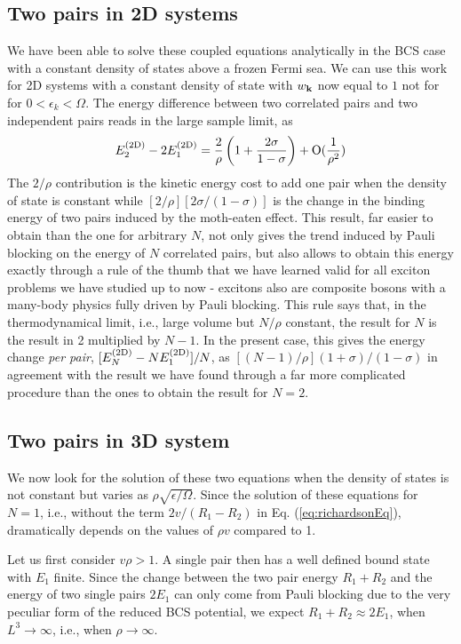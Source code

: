 \documentclass[3p,twocolumn]{elsarticle}
\begin{document}
\subsection{Two pairs in 2D systems}
We have been able to solve these coupled equations analytically in the BCS case with a constant density of states above a frozen Fermi sea\cite{combescotBCS}.  We can use  this work  for 2D systems with a constant density of state with $w_{\mathbf{k}}$ now equal to $1$ not for  for $0<\epsilon_k<\Omega$. The energy difference between two correlated pairs and two independent pairs reads in the large sample limit, as 
\begin{equation}
E^{{{\text{(2D)}}}}_2-2E_1^{{{\text{(2D)}}}}=\frac{2}{\rho}\left(1+\frac{2\sigma}{1-\sigma}\right)+\text{O}(\frac{1}{\rho^2})
\label{eq:}
\end{equation}
The $2/\rho$ contribution is the kinetic energy cost to add one pair when the density of state is constant while $[2/\rho][2\sigma/(1-\sigma)]$ is the change in the binding energy of two pairs induced by the moth-eaten effect. This result, far easier to obtain than the one for arbitrary $N$, not only gives the trend induced by Pauli blocking on the energy of $N$ correlated pairs, but also allows to obtain this energy exactly through a rule of the thumb that we have learned valid for all exciton problems we have studied up to now - excitons also are composite bosons with a many-body physics fully driven by Pauli blocking.  This rule says that, in the thermodynamical limit, i.e., large volume but $N/\rho$ constant, the result for $N$ is the result in 2 multiplied by $N-1$.  In the present case, this gives the energy change \emph{per pair}, $[E^{{{\text{(2D)}}}}_N-NE^{{{\text{(2D)}}}}_1]/N$, as $[(N-1)/\rho](1+\sigma)/(1-\sigma)$ in agreement with the result we have found through a far more complicated procedure than the ones to obtain the result for $N=2$.

\subsection{Two pairs in 3D system}
We now look for the solution of these two equations when the density of states is not constant but varies as $\rho\sqrt{\epsilon/\Omega}$.  Since the solution of these equations for $N=1$, i.e., without the term $2v/(R_1-R_2)$  in Eq. (\ref{eq:richardsonEq}), dramatically depends on the values of $\rho{}v$ compared to 1.

Let us first consider  $v\rho>1$.  A single pair then has a well defined bound state with $E_1$  finite. Since the change between the two pair energy $R_{1}+R_{2}$ and the energy of two single pairs  $2E_{1}$ can only come from Pauli blocking due to the very peculiar form of the reduced BCS potential, we expect $R_1+R_2\approx2E_1$, when $L^3\rightarrow\infty$, i.e., when $\rho\rightarrow\infty$. 
\end{document}

